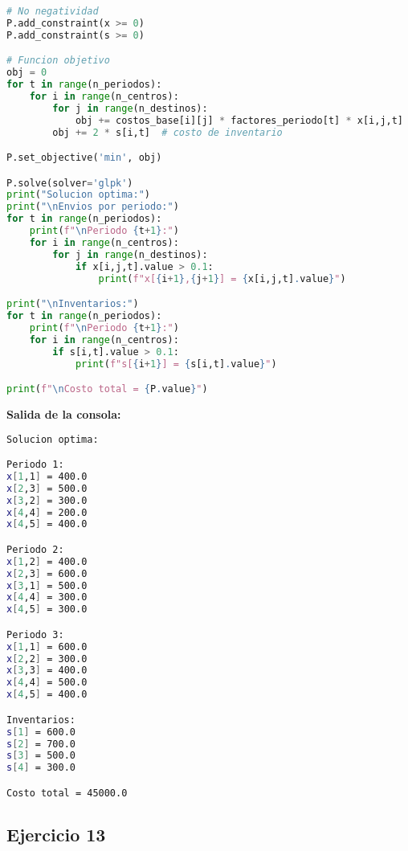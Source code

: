 \documentclass[12pt]{article}
\begin{document}
\begin{enumerate}
\begin{lstlisting}[language=Python]
# No negatividad
P.add_constraint(x >= 0)
P.add_constraint(s >= 0)

# Funcion objetivo
obj = 0
for t in range(n_periodos):
    for i in range(n_centros):
        for j in range(n_destinos):
            obj += costos_base[i][j] * factores_periodo[t] * x[i,j,t]
        obj += 2 * s[i,t]  # costo de inventario

P.set_objective('min', obj)

P.solve(solver='glpk')
print("Solucion optima:")
print("\nEnvios por periodo:")
for t in range(n_periodos):
    print(f"\nPeriodo {t+1}:")
    for i in range(n_centros):
        for j in range(n_destinos):
            if x[i,j,t].value > 0.1:
                print(f"x[{i+1},{j+1}] = {x[i,j,t].value}")

print("\nInventarios:")
for t in range(n_periodos):
    print(f"\nPeriodo {t+1}:")
    for i in range(n_centros):
        if s[i,t].value > 0.1:
            print(f"s[{i+1}] = {s[i,t].value}")

print(f"\nCosto total = {P.value}")
\end{lstlisting}

\textbf{Salida de la consola:}
\begin{lstlisting}[language=bash,backgroundcolor=\color{black},basicstyle=\color{white}\ttfamily,numbers=none]
Solucion optima:

Periodo 1:
x[1,1] = 400.0
x[2,3] = 500.0
x[3,2] = 300.0
x[4,4] = 200.0
x[4,5] = 400.0

Periodo 2:
x[1,2] = 400.0
x[2,3] = 600.0
x[3,1] = 500.0
x[4,4] = 300.0
x[4,5] = 300.0

Periodo 3:
x[1,1] = 600.0
x[2,2] = 300.0
x[3,3] = 400.0
x[4,4] = 500.0
x[4,5] = 400.0

Inventarios:
s[1] = 600.0
s[2] = 700.0
s[3] = 500.0
s[4] = 300.0

Costo total = 45000.0
\end{lstlisting}

\newpage

\subsection*{Ejercicio 13}


\end{enumerate}
\end{document}
